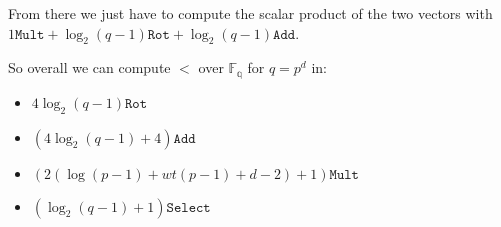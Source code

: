 \documentclass[a4paper,11pt]{article}
\theoremstyle{definition}
\begin{document}
From there we just have to compute the scalar product of the two vectors with $1\texttt{Mult} + \log_2(q-1)\texttt{Rot} + \log_2(q-1)\texttt{Add}$. \newline

So overall we can compute $<$ over $\mathbb{F_q}$ for $q = p^d$ in:

\begin{itemize}
\item $4\log_2 (q-1) \texttt{Rot}$
\item $(4\log_2 (q-1) + 4) \texttt{Add}$
\item $(2(\log (p-1) + wt(p-1) + d - 2) + 1) \texttt{Mult}$
\item $(\log_2 (q-1) + 1) \texttt{Select}$
\end{itemize}
\end{document}
